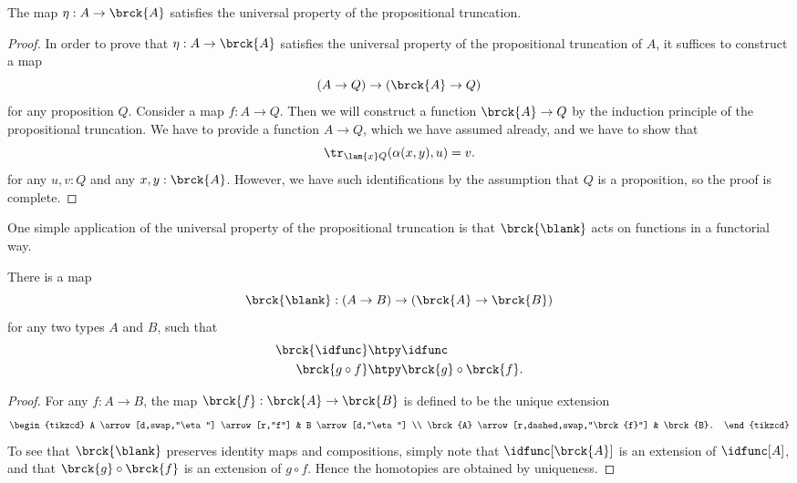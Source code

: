 \begin{thm}
  The map $\eta:A\to\brck{A}$ satisfies the universal property of the propositional truncation.
\end{thm}

\begin{proof}
  In order to prove that $\eta:A\to\brck{A}$ satisfies the universal property of the propositional truncation of $A$, it suffices to construct a map
  \begin{equation*}
    (A\to Q)\to (\brck{A}\to Q)
  \end{equation*}
  for any proposition $Q$. Consider a map $f:A\to Q$. Then we will construct a function $\brck{A}\to Q$ by the induction principle of the propositional truncation. We have to provide a function $A\to Q$, which we have assumed already, and we have to show that
  \begin{equation*}
    \tr_{\lam{x}Q}(\alpha(x,y),u)=v.
  \end{equation*}
  for any $u,v:Q$ and any $x,y:\brck{A}$. However, we have such identifications by the assumption that $Q$ is a proposition, so the proof is complete.
\end{proof}

 One simple application of the universal property of the propositional truncation is that $\brck{\blank}$ acts on functions in a functorial way.

\begin{prp}
  There is a map
  \begin{equation*}
    \brck{\blank}:(A\to B)\to (\brck{A}\to\brck{B})
  \end{equation*}
  for any two types $A$ and $B$, such that
  \begin{align*}
    \brck{\idfunc} & \htpy \idfunc \\
    \brck{g\circ f} & \htpy \brck{g}\circ\brck{f}.
  \end{align*}
\end{prp}

\begin{proof}
  For any $f:A\to B$, the map $\brck{f}:\brck{A}\to\brck{B}$ is defined to be the unique extension
  \begin{equation*}
    \begin{tikzcd}
      A \arrow[d,swap,"\eta"] \arrow[r,"f"] & B \arrow[d,"\eta"] \\
      \brck{A} \arrow[r,dashed,swap,"\brck{f}"] & \brck{B}.
    \end{tikzcd}
  \end{equation*}
  To see that $\brck{\blank}$ preserves identity maps and compositions, simply note that $\idfunc[\brck{A}]$ is an extension of $\idfunc[A]$, and that $\brck{g}\circ\brck{f}$ is an extension of $g\circ f$. Hence the homotopies are obtained by uniqueness.
\end{proof}


